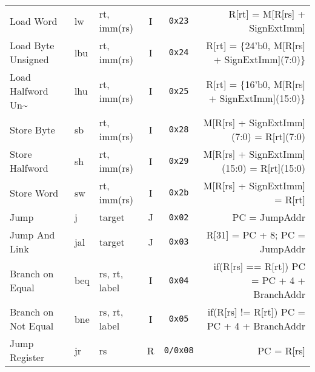 \begin{tabularx}{\textwidth}{lMAccD}
    Load Word                                                & lw    & rt, imm(rs)   & I & \texttt{0x23}   & R[rt] = M[R[rs] + SignExtImm]                  \footnotemark[2]                 \\
    Load Byte Unsigned                                       & lbu   & rt, imm(rs)   & I & \texttt{0x24}   & R[rt] = \{24'b0, M[R[rs] + SignExtImm](7:0)\}  \footnotemark[2]                 \\
    Load Halfword Un\textasciitilde{}                        & lhu   & rt, imm(rs)   & I & \texttt{0x25}   & R[rt] = \{16'b0, M[R[rs] + SignExtImm](15:0)\} \footnotemark[2]                 \\
    Store Byte                                               & sb    & rt, imm(rs)   & I & \texttt{0x28}   & M[R[rs] + SignExtImm](7:0) = R[rt](7:0)        \footnotemark[2]                 \\
    Store Halfword                                           & sh    & rt, imm(rs)   & I & \texttt{0x29}   & M[R[rs] + SignExtImm](15:0) = R[rt](15:0)      \footnotemark[2]                 \\
    Store Word                                               & sw    & rt, imm(rs)   & I & \texttt{0x2b}   & M[R[rs] + SignExtImm] = R[rt]                  \footnotemark[2]                 \\
    \midrule
    Jump                                                     & j     & target        & J & \texttt{0x02}   & PC = JumpAddr                                  \footnotemark[5]                 \\
    Jump And Link                                            & jal   & target        & J & \texttt{0x03}   & R[31] = PC + 8; PC = JumpAddr                  \footnotemark[5]                 \\
    Branch on Equal                                          & beq   & rs, rt, label & I & \texttt{0x04}   & if(R[rs] == R[rt]) PC = PC + 4 + BranchAddr    \footnotemark[4]                 \\
    Branch on Not Equal                                      & bne   & rs, rt, label & I & \texttt{0x05}   & if(R[rs] != R[rt]) PC = PC + 4 + BranchAddr    \footnotemark[4]                 \\
    Jump Register                                            & jr    & rs            & R & \texttt{0/0x08} & PC = R[rs]                                                                      \\
    \bottomrule
\end{tabularx}

